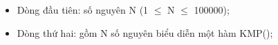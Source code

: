 \begin{itemize}
	\item     Dòng đầu tiên: số nguyên N (1  $\le$  N  $\le$  100000);   
	\item     Dòng thứ hai: gồm N số nguyên biểu diễn một hàm KMP();   
\end{itemize}